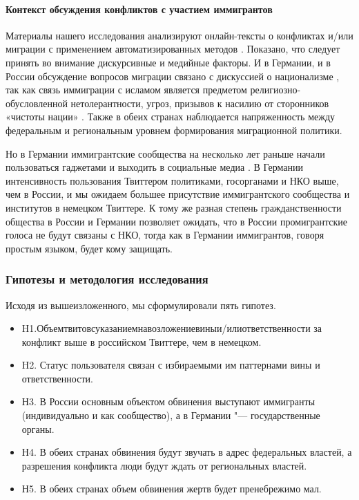 \paragraph{Контекст обсуждения конфликтов с участием иммигрантов}

Материалы нашего исследования анализируют онлайн-тексты о конфликтах и/или миграции с применением автоматизированных методов \cite{BikkulovBershadskaya,ApishevKoltcovKoltsova16,Gabrielova,BodrunovaLitvinenkoBlekanov2016,BodrunovaLitvinenkoBlekanov2017}. Показано, что следует принять во внимание дискурсивные и медийные факторы. И в Германии, и в России обсуждение вопросов миграции связано с дискуссией о национализме \cite{Elwert,Drobizheva}, так как связь иммиграции с исламом является предметом религиозно-обусловленной нетолерантности, угроз, призывов к насилию от сторонников «чистоты нации» \cite{Awan,BodrunovaLitvinenkoBlekanov2021}. Также в обеих странах наблюдается напряженность между федеральным и региональным уровнем формирования миграционной политики.

Но в Германии иммигрантские сообщества на несколько лет раньше начали пользоваться гаджетами и выходить в социальные медиа \cite{HeppBozdagSuna,Hinkelbein,KuzhelevaSagan}. В Германии интенсивность пользования Твиттером политиками, госорганами и НКО выше, чем в России, и мы ожидаем большее присутствие иммигрантского сообщества и институтов в немецком Твиттере. К тому же разная степень гражданственности общества в России и Германии позволяет ожидать, что в России промигрантские голоса не будут связаны с НКО, тогда как в Германии иммигрантов, говоря простым языком, будет кому защищать.

\subsubsection{Гипотезы и методология исследования}

Исходя из вышеизложенного, мы сформулировали пять гипотез.
\begin{itemize}
	\item H1.Объемтвитовсуказаниемнавозложениевиныи/илиответственности
	за конфликт выше в российском Твиттере, чем в немецком.
	\item H2. Статус пользователя связан с избираемыми им паттернами вины
	и ответственности.
	\item Н3. В России основным объектом обвинения выступают иммигранты
	(индивидуально и как сообщество), а в Германии "--- государственные
	органы.
	\item Н4. В обеих странах обвинения будут звучать в адрес федеральных
	властей, а разрешения конфликта люди будут ждать от региональных
	властей.
	\item Н5. В обеих странах объем обвинения жертв будет пренебрежимо
	мал.
\end{itemize}

